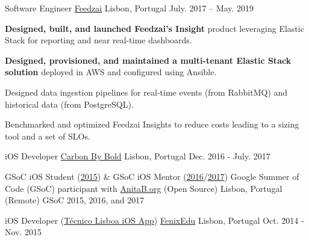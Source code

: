 \begin{cventries}
    
  \cventry
    {Software Engineer}
    {\href{https://feedzai.com/}{Feedzai}}
    {Lisbon, Portugal}
    {July. 2017 – May. 2019}
    {
      \begin{cvitems}
        \item \textbf{Designed, built, and launched Feedzai's Insight} product leveraging Elastic Stack for reporting and near real-time dashboards.
        \item \textbf{Designed, provisioned, and maintained a multi-tenant Elastic Stack solution} deployed in AWS and configured using Ansible.
        \item Designed data ingestion pipelines for real-time events (from RabbitMQ) and historical data (from PostgreSQL).
        \item Benchmarked and optimized Feedzai Insights to reduce costs leading to a sizing tool and a set of SLOs.
      \end{cvitems}
      \vspace{4mm}
    }

  \cventryShort
    {iOS Developer}
    {\href{https://www.carbonbybold.com/pt-pt/}{Carbon By Bold}}
    {Lisbon, Portugal}
    {Dec. 2016 - July. 2017}

  \cventryShort
    {GSoC iOS Student (\href{https://docs.google.com/presentation/d/1yv4XuNNpTgDkyOjL9SSjGe7PSZuwpbah42mQCACxdXQ/}{2015}) \& GSoC iOS Mentor (\href{https://summerofcode.withgoogle.com/archive/2016/projects/5509901874888704/}{2016}/\href{https://summerofcode.withgoogle.com/archive/2017/projects/5508656065937408/}{2017})}
    {Google Summer of Code (GSoC) participant with \href{http://anitaborg.org/}{AnitaB.org} (Open Source)}
    {Lisbon, Portugal (Remote)}
    {GSoC 2015, 2016, and 2017}
    
  \cventryShort
    {iOS Developer (\href{https://apps.apple.com/us/app/tecnico-lisboa/id959976468}{Técnico Lisboa iOS App})}
    {\href{http://fenixedu.org/}{FenixEdu}}
    {Lisbon, Portugal}
    {Oct. 2014 - Nov. 2015}

\end{cventries}
